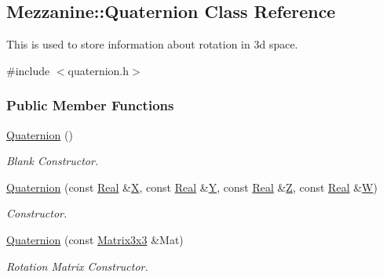 \hypertarget{classMezzanine_1_1Quaternion}{
\subsection{Mezzanine::Quaternion Class Reference}
\label{classMezzanine_1_1Quaternion}
}


This is used to store information about rotation in 3d space.  




{\ttfamily \#include $<$quaternion.h$>$}

\subsubsection*{Public Member Functions}
\begin{DoxyCompactItemize}
\item 
\hyperlink{classMezzanine_1_1Quaternion_a82af0a43a12385f691ea5440da930a4f}{Quaternion} ()
\begin{DoxyCompactList}\small\item\em Blank Constructor. \item\end{DoxyCompactList}\item 
\hyperlink{classMezzanine_1_1Quaternion_a1fa74f81cd7b9db015d8a8871ee28dd8}{Quaternion} (const \hyperlink{namespaceMezzanine_a726731b1a7df72bf3583e4a97282c6f6}{Real} \&\hyperlink{classMezzanine_1_1Quaternion_afe9d0fceef87816390f4181aadd9e683}{X}, const \hyperlink{namespaceMezzanine_a726731b1a7df72bf3583e4a97282c6f6}{Real} \&\hyperlink{classMezzanine_1_1Quaternion_ae0170f8f57a3471921a312413df42151}{Y}, const \hyperlink{namespaceMezzanine_a726731b1a7df72bf3583e4a97282c6f6}{Real} \&\hyperlink{classMezzanine_1_1Quaternion_a1d93e9f132b4e7c71127f2b307c998db}{Z}, const \hyperlink{namespaceMezzanine_a726731b1a7df72bf3583e4a97282c6f6}{Real} \&\hyperlink{classMezzanine_1_1Quaternion_a0efb51aeabeecf63fd30966ea68a0cdc}{W})
\begin{DoxyCompactList}\small\item\em Constructor. \item\end{DoxyCompactList}\item 
\hyperlink{classMezzanine_1_1Quaternion_ad4a5398effbc4858078ebe734d4726b3}{Quaternion} (const \hyperlink{classMezzanine_1_1Matrix3x3}{Matrix3x3} \&Mat)
\begin{DoxyCompactList}\small\item\em Rotation Matrix Constructor. \item\end{DoxyCompactList}\item 

\end{DoxyCompactItemize}

